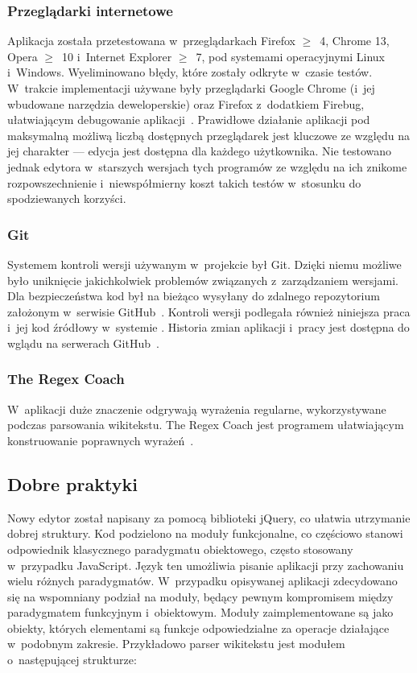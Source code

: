 \subsubsection{Przeglądarki internetowe}
Aplikacja została przetestowana w~przeglądarkach Firefox $\geq$~4, Chrome 13, Opera $\geq$~10 i~Internet Explorer $\geq$~7, pod systemami operacyjnymi Linux i~Windows. Wyeliminowano błędy, które zostały odkryte w~czasie testów. W~trakcie implementacji używane były przeglądarki Google Chrome (i~jej wbudowane narzędzia deweloperskie) oraz Firefox z~dodatkiem Firebug, ułatwiającym debugowanie aplikacji~\cite{firebug}. Prawidłowe działanie aplikacji pod maksymalną możliwą liczbą dostępnych przeglądarek jest kluczowe ze względu na jej charakter --- edycja jest dostępna dla każdego użytkownika. Nie testowano jednak edytora w~starszych wersjach tych programów ze względu na ich znikome rozpowszechnienie i~niewspółmierny koszt takich testów w~stosunku do spodziewanych korzyści.
\subsubsection{Git}
Systemem kontroli wersji używanym w~projekcie był Git. Dzięki niemu możliwe było uniknięcie jakichkolwiek problemów związanych z~zarządzaniem wersjami. Dla bezpieczeństwa kod był na bieżąco wysyłany do zdalnego repozytorium założonym w~serwisie GitHub~\cite{github}. Kontroli wersji podlegała również niniejsza praca i~jej kod źródłowy w~systemie \XeTeX. Historia zmian aplikacji i~pracy jest dostępna do wglądu na serwerach GitHub~\cite{github:wikt}.
\subsubsection{The Regex Coach}
W~aplikacji duże znaczenie odgrywają wyrażenia regularne, wykorzystywane podczas parsowania wikitekstu. The Regex Coach jest programem ułatwiającym konstruowanie poprawnych wyrażeń~\cite{regexcoach}.
\spacer

\subsection{Dobre praktyki}
Nowy edytor został napisany za pomocą biblioteki jQuery, co ułatwia utrzymanie dobrej struktury. Kod podzielono na moduły funkcjonalne, co częściowo stanowi odpowiednik klasycznego paradygmatu obiektowego, często stosowany w~przypadku JavaScript. Język ten umożliwia pisanie aplikacji przy zachowaniu wielu różnych paradygmatów. W~przypadku opisywanej aplikacji zdecydowano się na wspomniany podział na moduły, będący pewnym kompromisem między paradygmatem funkcyjnym i~obiektowym. Moduły zaimplementowane są jako obiekty, których elementami są funkcje odpowiedzialne za operacje działające w~podobnym zakresie. Przykładowo parser wikitekstu jest modułem o~następującej strukturze:

